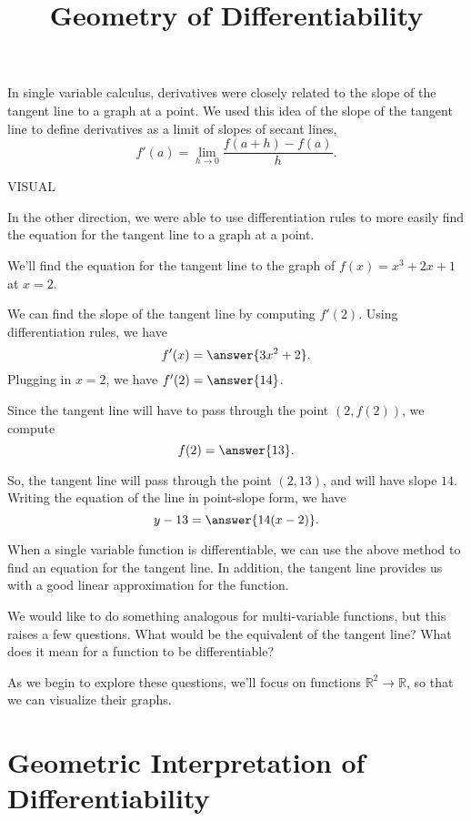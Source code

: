 \documentclass{ximera}
\title{Geometry of Differentiability}
\begin{document}
\begin{abstract}
\end{abstract}
\maketitle

In single variable calculus, derivatives were closely related to the slope of the tangent line to a graph at a point. We used this idea of the slope of the tangent line to define derivatives as a limit of slopes of secant lines,
\[
f'(a) = \lim_{h\rightarrow 0}\frac{f(a+h)-f(a)}{h}.
\]

VISUAL

In the other direction, we were able to use differentiation rules to more easily find the equation for the tangent line to a graph at a point.

\begin{example}
We'll find the equation for the tangent line to the graph of $f(x)=x^3+2x+1$ at $x=2$.

We can find the slope of the tangent line by computing $f'(2)$. Using differentiation rules, we have
\[
f'(x) = \answer{3x^2+2}.
\]
Plugging in $x=2$, we have $f'(2) = \answer{14}$.

Since the tangent line will have to pass through the point $(2,f(2))$, we compute
\[
f(2) = \answer{13}.
\]

So, the tangent line will pass through the point $(2,13)$, and will have slope $14$. Writing the equation of the line in point-slope form, we have
\[
y-13 = \answer{14(x-2)}.
\]
\end{example}

When a single variable function is differentiable, we can use the above method to find an equation for the tangent line. In addition, the tangent line provides us with a good linear approximation for the function.

We would like to do something analogous for multi-variable functions, but this raises a few questions. What would be the equivalent of the tangent line? What does it mean for a function to be differentiable?

As we begin to explore these questions, we'll focus on functions $\mathbb{R}^2\rightarrow\mathbb{R}$, so that we can visualize their graphs.

\section*{Geometric Interpretation of Differentiability}
\end{document}
